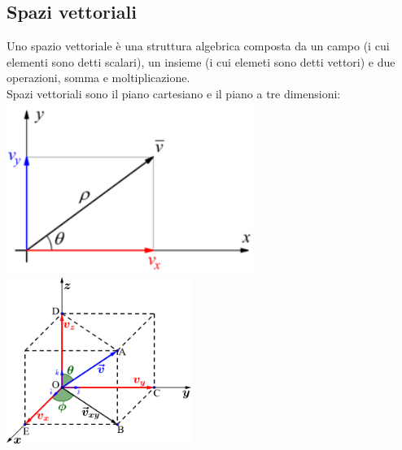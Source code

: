 \documentclass[a4paper]{article}
\begin{document}
\subsection{Spazi vettoriali}
Uno spazio vettoriale è una struttura algebrica composta da un campo (i cui elementi sono detti scalari), un insieme (i cui elemeti sono detti vettori) e due operazioni, somma e moltiplicazione.
\\ Spazi vettoriali sono il piano cartesiano e il piano a tre dimensioni:
\\

\includegraphics[width=8cm]{piano_cartesiano.png}
\includegraphics[width=6cm]{piano_tre_dimensioni.png}
\\
\end{document}
